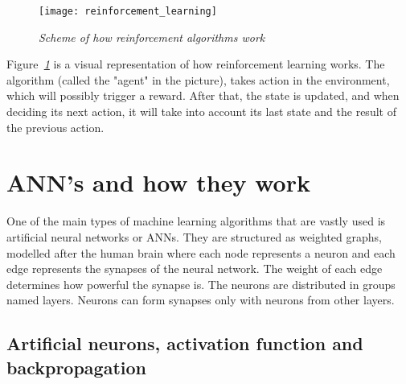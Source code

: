 \begin{figure}[h]
    \centering
    \texttt{[image: reinforcement\_learning]}
    \caption{\emph{Scheme of how reinforcement algorithms work \cite{typesMLMedium}}}
    \label{fig:reinforcement_learning}
\end{figure}

Figure\emph{~\ref{fig:reinforcement_learning}} is a visual representation of how reinforcement learning works. The algorithm
(called the "agent" in the picture), takes action in the environment,
which will possibly trigger a reward. After that, the state is updated,
and when deciding its next action, it will take into account its last state and the
result of the previous action.

\section{ANN's and how they work}
One of the main types of machine learning algorithms that are vastly used is
artificial neural networks or ANNs.
They are structured as weighted graphs, modelled after the
human brain where each node represents a neuron and each
edge represents the synapses of the neural network.
The weight of each edge determines how powerful the synapse is.
The neurons are distributed in groups named layers.
Neurons can form synapses only with neurons from other layers.

\subsection{Artificial neurons, activation function and backpropagation}




